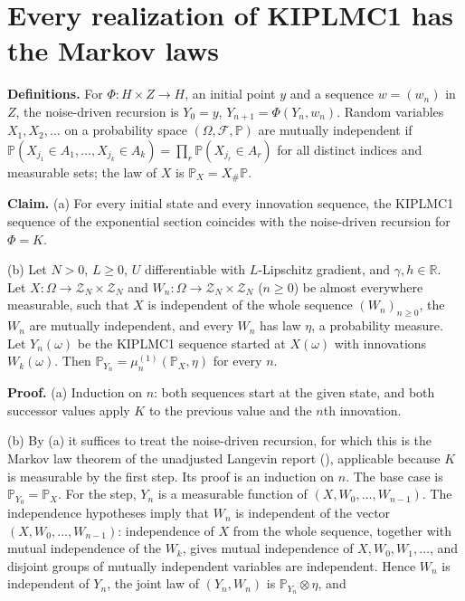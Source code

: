 \documentclass[11pt,a4paper]{article}
\begin{document}
\section{\texorpdfstring{Every realization of KIPLMC1 has the Markov laws}{Every realization of KIPLMC1 has the Markov laws}}


\textbf{Definitions.} For \(\Phi:H\times Z\to H\), an initial point \(y\) and a sequence \(w=(w_n)\) in \(Z\), the noise-driven recursion is \(Y_0=y\), \(Y_{n+1}=\Phi(Y_n,w_n)\). Random variables \(X_1,X_2,\dots\) on a probability space \((\Omega,\mathcal F,\mathbb P)\) are mutually independent if \(\mathbb P(X_{j_1}\in A_1,\dots,X_{j_k}\in A_k)=\prod_r\mathbb P(X_{j_r}\in A_r)\) for all distinct indices and measurable sets; the law of \(X\) is \(\mathbb P_X=X_\#\mathbb P\).




\textbf{Claim.} (a) For every initial state and every innovation sequence, the KIPLMC1 sequence of the exponential section coincides with the noise-driven recursion for \(\Phi=K\).




(b) Let \(N>0\), \(L\ge0\), \(U\) differentiable with \(L\)-Lipschitz gradient, and \(\gamma,h\in\mathbb R\). Let \(X:\Omega\to\mathcal Z_N\times\mathcal Z_N\) and \(W_n:\Omega\to\mathcal Z_N\times\mathcal Z_N\) (\(n\ge0\)) be almost everywhere measurable, such that \(X\) is independent of the whole sequence \((W_n)_{n\ge0}\), the \(W_n\) are mutually independent, and every \(W_n\) has law \(\eta\), a probability measure. Let \(Y_n(\omega)\) be the KIPLMC1 sequence started at \(X(\omega)\) with innovations \(W_k(\omega)\). Then \(\mathbb P_{Y_n}=\mu^{(1)}_n(\mathbb P_X,\eta)\) for every \(n\).




\textbf{Proof.} (a) Induction on \(n\): both sequences start at the given state, and both successor values apply \(K\) to the previous value and the \(n\)th innovation.




(b) By (a) it suffices to treat the noise-driven recursion, for which this is the Markov law theorem of the unadjusted Langevin report (\cite[Section~3.33.12]{LangevinLean2026ULASC}), applicable because \(K\) is measurable by the first step. Its proof is an induction on \(n\). The base case is \(\mathbb P_{Y_0}=\mathbb P_X\). For the step, \(Y_n\) is a measurable function of \((X,W_0,\dots,W_{n-1})\). The independence hypotheses imply that \(W_n\) is independent of the vector \((X,W_0,\dots,W_{n-1})\): independence of \(X\) from the whole sequence, together with mutual independence of the \(W_k\), gives mutual independence of \(X,W_0,W_1,\dots\), and disjoint groups of mutually independent variables are independent. Hence \(W_n\) is independent of \(Y_n\), the joint law of \((Y_n,W_n)\) is \(\mathbb P_{Y_n}\otimes\eta\), and
\end{document}
